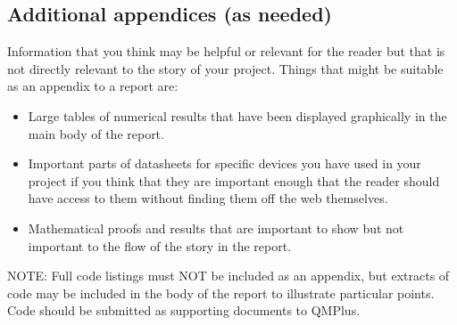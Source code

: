 \subsection*{Additional appendices (as needed)}
{}

Information that you think may be helpful or relevant for the reader but that is not directly relevant to the story of your project. Things that might be suitable as an appendix to a report are:

\begin{itemize}
    \item Large tables of numerical results that have been displayed graphically in the main body of the report.
    \item Important parts of datasheets for specific devices you have used in your project if you think that they are important enough that the reader should have access to them without finding them off the web themselves.
    \item Mathematical proofs and results that are important to show but not important to the flow of the story in the report.
\end{itemize}

NOTE: Full code listings must NOT be included as an appendix, but extracts of code may be included in the body of the report to illustrate particular points. Code should be submitted as supporting documents to QMPlus.